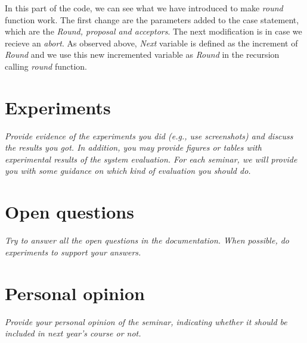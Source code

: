 \documentclass[a4paper, 10pt]{article}
\begin{document}
  In this part of the code, we can see what we have introduced to make \textit{round} function work. The first change are the parameters added to the case statement, which are the \textit{Round, proposal and acceptors}. The next modification is in case we recieve an \textit{abort}. As observed above, \textit{Next} variable is defined as the increment of \textit{Round} and we use this new incremented variable as \textit{Round} in the recursion calling \textit{round} function. 
  

\section{Experiments}

\textit{Provide evidence of the experiments you did (e.g., use screenshots) and discuss the results you got. In addition, you may provide figures or tables with experimental results of the system evaluation. For each seminar, we will provide you with some guidance on which kind of evaluation you should do.}

\section{Open questions}

\textit{Try to answer all the open questions in the documentation. When possible, do experiments to support your answers.}

\section{Personal opinion}

\textit{Provide your personal opinion of the seminar, indicating whether it should be included in next year's course or not.}
\end{document}
